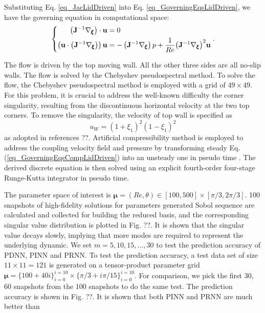 \documentclass[preprint, 10pt]{elsarticle}
\begin{document}
Substituting Eq. \ref{eq_JacLidDriven} into Eq. \ref {eq_GoverningEqsLidDriven}, we have the governing equation in computational space:
\begin{equation}
\left \{
\begin{aligned}
\left(\mathbf{J}^{-1} \nabla_{\pmb {\xi}}\right)  \cdot {\bf{u}} &= 0 \\
\left( {{\bf{u}} \cdot \left(\mathbf{J}^{-1} \nabla_{\pmb {\xi}}\right) } \right){\bf{u}} &=  - \left(\mathbf{J}^{-1} \nabla_{\pmb {\xi}}\right) p + \frac{1}{Re}{\left(\mathbf{J}^{-1} \nabla_{\pmb {\xi}}\right) ^2}{\bf{u}}
\end{aligned}
\right .
.
\label{eq_GoverningEqsCompLidDriven}
\end{equation}

The flow is driven by the top moving wall. All the other three sides are all no-slip walls. The flow is solved by the Chebyshev pseudospectral method. To solve the flow, the Chebyshev pseudospectral method is employed with a grid of $49 \times 49$.
For this problem, it is crucial to address the well-known difficulty the corner singularity, resulting from the discontinuous horizontal velocity at the two top corners. To remove the singularity, the velocity of top wall is specified as
\begin{equation}
u_W = (1+\xi_1)^2(1-\xi_1)^2
\end{equation}
as adopted in references ??.
Artificial compressibility method is employed to address the coupling velocity field and pressure by  transforming steady  Eq. (\ref{eq_GoverningEqsCompLidDriven}) into an unsteady one in pseudo time . The derived discrete equation is then solved using an explicit fourth-order four-stage Runge-Kutta integrator in pseudo time.

The parameter space of interest is $\pmb{\mu}=(Re, \theta) \in [100,500] \times [\pi/3, 2\pi/3]$. 100 snapshots of high-fidelity solutions for parameters generated Sobol sequence are calculated and collected for building the reduced basis, and the corresponding singular value distribution is plotted in Fig. ??. It is shown that the singular value decays slowly, implying that more modes are required to represent the underlying dynamic. We set $m=5, 10, 15,...,30$ to test the prediction accuracy of PDNN, PINN and PRNN.
To test the prediction accuracy, a test data set of size $11 \times 11=121$ is generated on a tensor-product parameter grid $\pmb{\mu}=\{100+ 40i\}_{i=0}^{i=10} \times \{\pi/3+ i\pi/15\}_{i=0}^{i=10}$.
For comparison, we pick the first 30, 60 snapshots from the 100 snapshots to do the same test.
The prediction accuracy is shown in Fig. ??. It is shown that both PINN and PRNN are much better than
\end{document}
